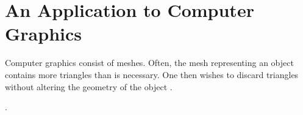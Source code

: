 \section{An Application to Computer Graphics}
\label{sec:graphics}

Computer graphics consist of meshes. Often, the mesh representing
an object contains more triangles than is necessary. One then wishes to
discard triangles without altering the geometry of the object \cite{simplify-mesh-1999}.


\cite{mmsb-2003}.









